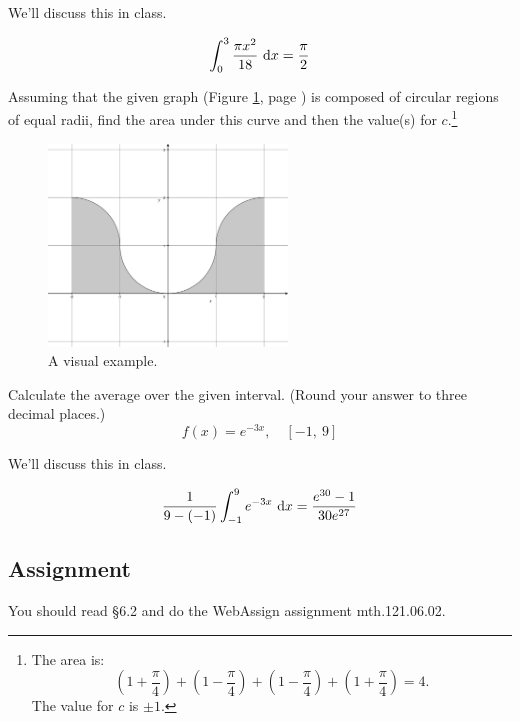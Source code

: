 \documentclass[12pt,addpoints, answers, fleqn]{exam}
\begin{document}
\begin{questions}
\begin{solution}
We'll discuss this in class.

\[
 \int_0^3 \frac{\pi x^2}{18} \ {\rm{d}} x = \frac{\pi}{2}
 \]
\end{solution}

\question Assuming that the given graph (Figure \ref{fig:graph3123}, page \pageref{fig:graph3123}) is composed of circular regions of equal radii, find the area under this curve and then the value(s) for $c$.\footnote{The area is:
\[
\left( 1 + \frac{\pi}{4} \right) + \left( 1 - \frac{\pi}{4} \right)
+ \left( 1 - \frac{\pi}{4} \right) + \left( 1 + \frac{\pi}{4} \right) = 4.
\]
The value for $c$ is $\pm 1$.}
\begin{figure}[htbp] %
   \centering
   \includegraphics[width=2.5in]{./graphics/graph3123.pdf} 
   \caption{A visual example.}
   \label{fig:graph3123}
\end{figure}

\question Calculate the average over the given interval. (Round your answer to three decimal places.)
\[
f\left(x\right) = e^{-3x}, \quad      \left[ -1, \ 9 \right]
\]

\begin{solution}
We'll discuss this in class.

\[
\frac{1}{9 - \left( -1 \right)}  \int_{-1}^9 e^{-3x} \ {\rm{d}}x = \frac{e^{30} -1 }{30 e^{27}}
 \]
\end{solution}

\end{questions}
\subsection{Assignment}
You should read \S  6.2 and do the WebAssign assignment mth.121.06.02.
\vfill
\pagebreak
\end{document}
